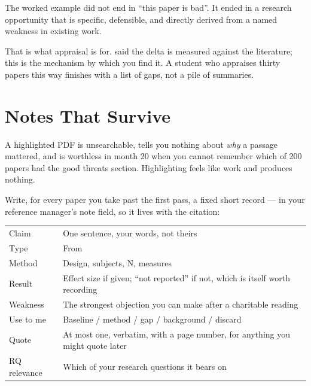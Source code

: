 \begin{conceptbox}
The worked example did not end in ``this paper is bad''. It ended in a research
opportunity that is specific, defensible, and directly derived from a named
weakness in existing work.

\medskip
That is what appraisal is for.  said the delta is measured
against the literature; this is the mechanism by which you find it. A student
who appraises thirty papers this way finishes with a list of gaps, not a pile
of summaries.
\end{conceptbox}

\section{Notes That Survive}

\begin{pitfall}
A highlighted PDF is unsearchable, tells you nothing about \emph{why} a passage
mattered, and is worthless in month 20 when you cannot remember which of 200
papers had the good threats section. Highlighting feels like work and produces
nothing.
\end{pitfall}

Write, for every paper you take past the first pass, a fixed short record ---
in your reference manager's note field, so it lives with the citation:

\begin{center}
\small
\begin{tabular}{@{}L{3.0cm}L{11.3cm}@{}}
\toprule
Claim          & One sentence, your words, not theirs \\
Type           & From  \\
Method         & Design, subjects, N, measures \\
Result         & Effect size if given; ``not reported'' if not, which is itself
                 worth recording \\
Weakness       & The strongest objection you can make after a charitable
                 reading \\
Use to me      & Baseline / method / gap / background / discard \\
Quote          & At most one, verbatim, with a page number, for anything you
                 might quote later \\
RQ relevance   & Which of your research questions it bears on \\
\bottomrule
\end{tabular}
\end{center}

